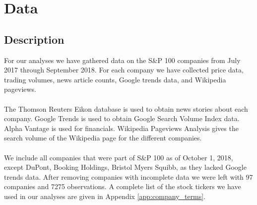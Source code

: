 
\chapter{Data}


\section{Description}
For our analyses we have gathered data on the  S\&P 100 companies from July 2017 through September 2018. For each company we have collected price data, trading volumes, news article counts, Google trends data, and Wikipedia pageviews.  
\\\\
The Thomson Reuters Eikon database is used to obtain news stories about each company. Google Trends is used to obtain Google Search Volume Index data. Alpha Vantage is used for financials. Wikipedia Pageviews Analysis gives the search volume of the Wikipedia page for the different companies. 
\\\\
We include all companies that were part of S\&P 100 as of October 1, 2018, except DuPont, Booking Holdings, Bristol Myers Squibb, as they lacked Google trends data. After removing companies with incomplete data we were left with 97 companies and 7275 observations. A complete list of the stock tickers we have used in our analyses are given in Appendix \ref{app:company_terms}.


